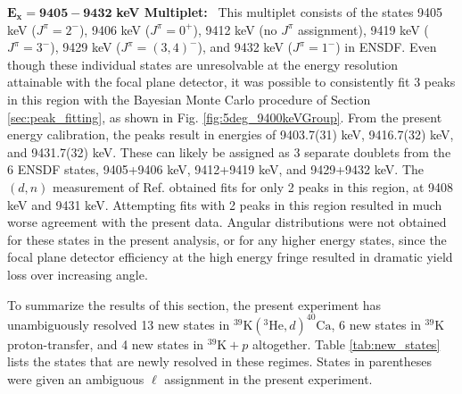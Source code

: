 \emph{$\mathbf{E_{x} = 9405-9432}$} \textbf{keV Multiplet:} \, 
This multiplet consists of the states 9405 keV ($J^{\pi} = 2^{-}$), 9406 keV ($J^{\pi} = 0^{+}$), 9412 keV (no $J^{\pi}$ assignment), 9419 keV ($J^{\pi} = 3^{-}$), 9429 keV ($J^{\pi} = (3,4)^{-}$), and 9432 keV ($J^{\pi} = 1^{-}$) in ENSDF. Even though these individual states are unresolvable at the energy resolution attainable with the focal plane detector, it was possible to consistently fit 3 peaks in this region with the Bayesian Monte Carlo procedure of Section \ref{sec:peak_fitting}, as shown in Fig. \ref{fig:5deg_9400keVGroup}. From the present energy calibration, the peaks result in energies of 9403.7(31) keV, 9416.7(32) keV, and 9431.7(32) keV. These can likely be assigned as 3 separate doublets from the 6 ENSDF states, 9405+9406 keV, 9412+9419 keV, and 9429+9432 keV. The $(d,n)$ measurement of Ref. \cite{Fuchs1969} obtained fits for only 2 peaks in this region, at 9408 keV and 9431 keV. Attempting fits with 2 peaks in this region resulted in much worse agreement with the present data. Angular distributions were not obtained for these states in the present analysis, or for any higher energy states, since the focal plane detector efficiency at the high energy fringe resulted in dramatic yield loss over increasing angle.

To summarize the results of this section, the present experiment has unambiguously resolved 13 new states in $^{39}\mathrm{K}(^{3}\mathrm{He},d)^{40}\mathrm{Ca}$, 6 new states in $^{39}$K proton-transfer, and 4 new states in $^{39}\mathrm{K}+p$ altogether. Table \ref{tab:new_states} lists the states that are newly resolved in these regimes. States in parentheses were given an ambiguous $\ell$ assignment in the present experiment.


